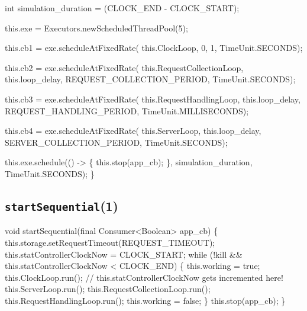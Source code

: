   int simulation_duration = (CLOCK_END - CLOCK_START);

  this.exe = Executors.newScheduledThreadPool(5);

  this.cb1 = exe.scheduleAtFixedRate(
    this.ClockLoop, 0, 1, TimeUnit.SECONDS);

  this.cb2 = exe.scheduleAtFixedRate(
    this.RequestCollectionLoop, this.loop_delay, REQUEST_COLLECTION_PERIOD, TimeUnit.SECONDS);

  this.cb3 = exe.scheduleAtFixedRate(
    this.RequestHandlingLoop, this.loop_delay, REQUEST_HANDLING_PERIOD, TimeUnit.MILLISECONDS);

  this.cb4 = exe.scheduleAtFixedRate(
    this.ServerLoop, this.loop_delay, SERVER_COLLECTION_PERIOD, TimeUnit.SECONDS);

  this.exe.schedule(() -> \{
    this.stop(app_cb);
  \}, simulation_duration, TimeUnit.SECONDS);
\}
\eatline
{}\nwendcode{}\nwdocspar
\subsection{\texttt{startSequential}(1)}
\nwenddocs{}\endmoddef{}
void startSequential(final Consumer<Boolean> app_cb) \{
  this.storage.setRequestTimeout(REQUEST_TIMEOUT);
  this.statControllerClockNow = CLOCK_START;
  while (!kill && this.statControllerClockNow < CLOCK_END) \{
    this.working = true;
    this.ClockLoop.run();  // this.statControllerClockNow gets incremented here!
    this.ServerLoop.run();
    this.RequestCollectionLoop.run();
    this.RequestHandlingLoop.run();
    this.working = false;
  \}
  this.stop(app_cb);
\}
\eatline
{}\nwendcode{}\nwdocspar
